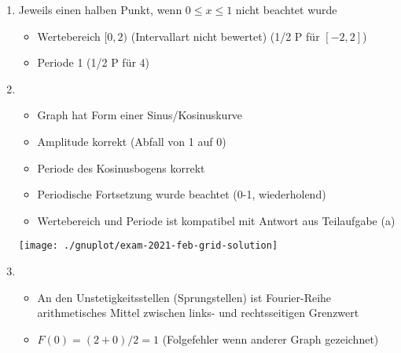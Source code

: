 \item
	\begin{enumerate}
	
		\item Jeweils einen halben Punkt, wenn $0\le x \le 1$ nicht beachtet wurde
			\begin{itemize}
				\item Wertebereich $[0,2)$ (Intervallart nicht bewertet) (1/2 P für $[-2,2]$)
				\item Periode 1 (1/2 P für $4$)
			\end{itemize}
		
		\item
			\begin{itemize}
				\item Graph hat Form einer Sinus/Kosinuskurve
				\item Amplitude korrekt (Abfall von 1 auf 0)
				\item Periode des Kosinusbogens korrekt 
				\item Periodische Fortsetzung wurde beachtet (0-1, wiederholend)
				\item Wertebereich und Periode ist kompatibel mit Antwort aus Teilaufgabe (a)
			\end{itemize}
		
			\begin{center}
				\texttt{[image: ./gnuplot/exam-2021-feb-grid-solution]}
			\end{center}
		
		\item 
			\begin{itemize}
				\item An den Unstetigkeitsstellen (Sprungstellen) ist Fourier-Reihe arithmetisches Mittel zwischen links- und rechtsseitigen Grenzwert
				\item $F(0) = (2+0)/2 = 1$ (Folgefehler wenn anderer Graph gezeichnet)
			\end{itemize}
	
	\end{enumerate}
